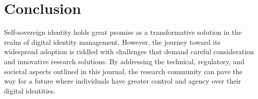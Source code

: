 \section*{Conclusion}
Self-sovereign identity holds great promise as a transformative solution in the realm of digital identity management. However, the journey toward its widespread adoption is riddled with challenges that demand careful consideration and innovative research solutions. By addressing the technical, regulatory, and societal aspects outlined in this journal, the research community can pave the way for a future where individuals have greater control and agency over their digital identities.




